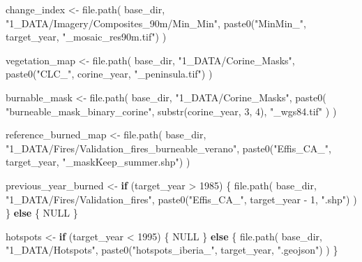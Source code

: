 \documentclass[
  british,
  a4paper,
]{scrbook}
\newenvironment{Shaded}{\begin{snugshade}}{\end{snugshade}}
\newcommand{\ConstantTok}[1]{\textcolor[rgb]{0.56,0.35,0.01}{#1}}
\newcommand{\ControlFlowTok}[1]{\textcolor[rgb]{0.00,0.23,0.31}{\textbf{#1}}}
\newcommand{\DecValTok}[1]{\textcolor[rgb]{0.68,0.00,0.00}{#1}}
\newcommand{\FunctionTok}[1]{\textcolor[rgb]{0.28,0.35,0.67}{#1}}
\newcommand{\NormalTok}[1]{\textcolor[rgb]{0.00,0.23,0.31}{#1}}
\newcommand{\OtherTok}[1]{\textcolor[rgb]{0.00,0.23,0.31}{#1}}
\newcommand{\SpecialCharTok}[1]{\textcolor[rgb]{0.37,0.37,0.37}{#1}}
\newcommand{\StringTok}[1]{\textcolor[rgb]{0.13,0.47,0.30}{#1}}
\begin{document}
\begin{Shaded}
\begin{Highlighting}[]
\NormalTok{change\_index }\OtherTok{\textless{}{-}} \FunctionTok{file.path}\NormalTok{(}
\NormalTok{  base\_dir,}
  \StringTok{"1\_DATA/Imagery/Composites\_90m/Min\_Min"}\NormalTok{,}
  \FunctionTok{paste0}\NormalTok{(}\StringTok{"MinMin\_"}\NormalTok{, target\_year, }\StringTok{"\_mosaic\_res90m.tif"}\NormalTok{)}
\NormalTok{)}

\NormalTok{vegetation\_map }\OtherTok{\textless{}{-}} \FunctionTok{file.path}\NormalTok{(}
\NormalTok{  base\_dir,}
  \StringTok{"1\_DATA/Corine\_Masks"}\NormalTok{,}
  \FunctionTok{paste0}\NormalTok{(}\StringTok{"CLC\_"}\NormalTok{, corine\_year, }\StringTok{"\_peninsula.tif"}\NormalTok{)}
\NormalTok{)}

\NormalTok{burnable\_mask }\OtherTok{\textless{}{-}} \FunctionTok{file.path}\NormalTok{(}
\NormalTok{  base\_dir,}
  \StringTok{"1\_DATA/Corine\_Masks"}\NormalTok{,}
  \FunctionTok{paste0}\NormalTok{(}
    \StringTok{"burneable\_mask\_binary\_corine"}\NormalTok{,}
    \FunctionTok{substr}\NormalTok{(corine\_year, }\DecValTok{3}\NormalTok{, }\DecValTok{4}\NormalTok{),}
    \StringTok{"\_wgs84.tif"}
\NormalTok{  )}
\NormalTok{)}

\NormalTok{reference\_burned\_map }\OtherTok{\textless{}{-}} \FunctionTok{file.path}\NormalTok{(}
\NormalTok{  base\_dir,}
  \StringTok{"1\_DATA/Fires/Validation\_fires\_burneable\_verano"}\NormalTok{,}
  \FunctionTok{paste0}\NormalTok{(}\StringTok{"Effis\_CA\_"}\NormalTok{, target\_year, }\StringTok{"\_maskKeep\_summer.shp"}\NormalTok{)}
\NormalTok{)}

\NormalTok{previous\_year\_burned }\OtherTok{\textless{}{-}} \ControlFlowTok{if}\NormalTok{ (target\_year }\SpecialCharTok{\textgreater{}} \DecValTok{1985}\NormalTok{) \{}
  \FunctionTok{file.path}\NormalTok{(}
\NormalTok{    base\_dir,}
    \StringTok{"1\_DATA/Fires/Validation\_fires"}\NormalTok{,}
    \FunctionTok{paste0}\NormalTok{(}\StringTok{"Effis\_CA\_"}\NormalTok{, target\_year }\SpecialCharTok{{-}} \DecValTok{1}\NormalTok{, }\StringTok{".shp"}\NormalTok{)}
\NormalTok{  )}
\NormalTok{\} }\ControlFlowTok{else}\NormalTok{ \{}
  \ConstantTok{NULL}
\NormalTok{\}}

\NormalTok{hotspots }\OtherTok{\textless{}{-}} \ControlFlowTok{if}\NormalTok{ (target\_year }\SpecialCharTok{\textless{}} \DecValTok{1995}\NormalTok{) \{}
  \ConstantTok{NULL}
\NormalTok{\} }\ControlFlowTok{else}\NormalTok{ \{}
  \FunctionTok{file.path}\NormalTok{(}
\NormalTok{    base\_dir,}
    \StringTok{"1\_DATA/Hotspots"}\NormalTok{,}
    \FunctionTok{paste0}\NormalTok{(}\StringTok{"hotspots\_iberia\_"}\NormalTok{, target\_year, }\StringTok{".geojson"}\NormalTok{)}
\NormalTok{  )}
\NormalTok{\}}


\end{Highlighting}
\end{Shaded}
\end{document}
